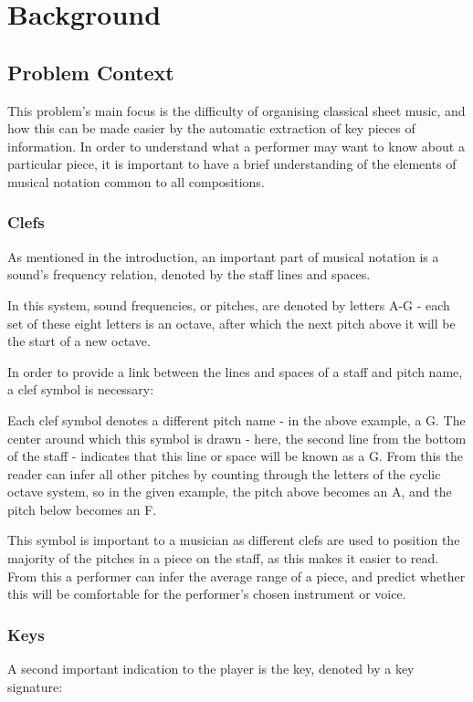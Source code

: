 \section{Background}
\subsection{Problem Context}
This problem's main focus is the difficulty of organising classical sheet music, and how this can be made easier by the automatic extraction of key pieces  of information. In order to understand what a performer may want to know about a particular piece, it is important to have a brief understanding of the elements of musical notation common to all compositions.
\subsubsection{Clefs}
As mentioned in the introduction, an important part of musical notation is a sound's frequency relation, denoted by the staff lines and spaces. 

In this system, sound frequencies, or pitches, are denoted by letters A-G - each set of these eight letters is an octave, after which the next pitch above it will be the start of a new octave.

In order to provide a link between the lines and spaces of a staff and pitch name, a clef symbol is necessary:

Each clef symbol denotes a different pitch name - in the above example, a G. The center around which this symbol is drawn - here, the second line from the bottom of the staff - indicates that this line or space will be known as a G. From this the reader can infer all other pitches by counting through the letters of the cyclic octave system, so in the given example, the pitch above becomes an A, and the pitch below becomes an F.

This symbol is important to a musician as different clefs are used to position the majority of the pitches in a piece on the staff, as this makes it easier to read. From this a performer can infer the average range of a piece, and predict whether this will be comfortable for the performer's chosen instrument or voice.

\subsubsection{Keys}
A second important indication to the player is the key, denoted by a key signature:

